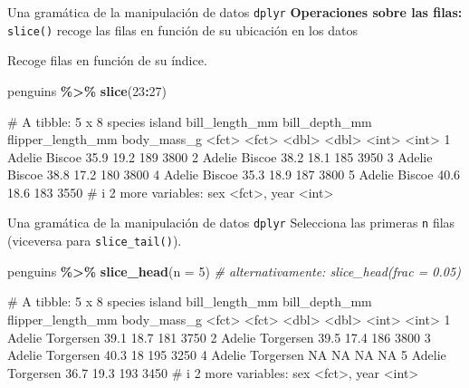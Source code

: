 \documentclass[
  ignorenonframetext,
  aspectratio=169]{beamer}
\newenvironment{Shaded}{\begin{snugshade}}{\end{snugshade}}
\newcommand{\AttributeTok}[1]{\textcolor[rgb]{0.13,0.29,0.53}{#1}}
\newcommand{\CommentTok}[1]{\textcolor[rgb]{0.56,0.35,0.01}{\textit{#1}}}
\newcommand{\DecValTok}[1]{\textcolor[rgb]{0.00,0.00,0.81}{#1}}
\newcommand{\FunctionTok}[1]{\textcolor[rgb]{0.13,0.29,0.53}{\textbf{#1}}}
\newcommand{\NormalTok}[1]{#1}
\newcommand{\SpecialCharTok}[1]{\textcolor[rgb]{0.81,0.36,0.00}{\textbf{#1}}}
\let\oldverbatim\verbatim
\let\endoldverbatim\endverbatim
\renewenvironment{verbatim}{\tiny\oldverbatim}{\endoldverbatim}
\begin{document}
\begin{frame}[fragile]{Una gramática de la manipulación de datos
\texttt{dplyr}}
\label{una-gramuxe1tica-de-la-manipulaciuxf3n-de-datos-dplyr}
\textbf{Operaciones sobre las filas:} \texttt{slice()} recoge las filas
en función de su ubicación en los datos

Recoge filas en función de su índice.

\begin{Shaded}
\begin{Highlighting}[]
\NormalTok{penguins }\SpecialCharTok{\%\textgreater{}\%} 
  \FunctionTok{slice}\NormalTok{(}\DecValTok{23}\SpecialCharTok{:}\DecValTok{27}\NormalTok{)}
\end{Highlighting}
\end{Shaded}

\begin{verbatim}
# A tibble: 5 x 8
  species island bill_length_mm bill_depth_mm flipper_length_mm body_mass_g
  <fct>   <fct>           <dbl>         <dbl>             <int>       <int>
1 Adelie  Biscoe           35.9          19.2               189        3800
2 Adelie  Biscoe           38.2          18.1               185        3950
3 Adelie  Biscoe           38.8          17.2               180        3800
4 Adelie  Biscoe           35.3          18.9               187        3800
5 Adelie  Biscoe           40.6          18.6               183        3550
# i 2 more variables: sex <fct>, year <int>
\end{verbatim}
\end{frame}

\begin{frame}[fragile]{Una gramática de la manipulación de datos
\texttt{dplyr}}
\label{una-gramuxe1tica-de-la-manipulaciuxf3n-de-datos-dplyr-1}
Selecciona las primeras \texttt{n} filas (viceversa para
\texttt{slice\_tail()}).

\begin{Shaded}
\begin{Highlighting}[]
\NormalTok{penguins }\SpecialCharTok{\%\textgreater{}\%} 
  \FunctionTok{slice\_head}\NormalTok{(}\AttributeTok{n =} \DecValTok{5}\NormalTok{) }\CommentTok{\# alternativamente: slice\_head(frac = 0.05)}
\end{Highlighting}
\end{Shaded}

\begin{verbatim}
# A tibble: 5 x 8
  species island    bill_length_mm bill_depth_mm flipper_length_mm body_mass_g
  <fct>   <fct>              <dbl>         <dbl>             <int>       <int>
1 Adelie  Torgersen           39.1          18.7               181        3750
2 Adelie  Torgersen           39.5          17.4               186        3800
3 Adelie  Torgersen           40.3          18                 195        3250
4 Adelie  Torgersen           NA            NA                  NA          NA
5 Adelie  Torgersen           36.7          19.3               193        3450
# i 2 more variables: sex <fct>, year <int>
\end{verbatim}
\end{frame}
\end{document}
